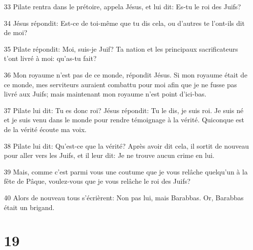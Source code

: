 \par 33 Pilate rentra dans le prétoire, appela Jésus, et lui dit: Es-tu le roi des Juifs?
\par 34 Jésus répondit: Est-ce de toi-même que tu dis cela, ou d'autres te l'ont-ils dit de moi?
\par 35 Pilate répondit: Moi, suis-je Juif? Ta nation et les principaux sacrificateurs t'ont livré à moi: qu'as-tu fait?
\par 36 Mon royaume n'est pas de ce monde, répondit Jésus. Si mon royaume était de ce monde, mes serviteurs auraient combattu pour moi afin que je ne fusse pas livré aux Juifs; mais maintenant mon royaume n'est point d'ici-bas.
\par 37 Pilate lui dit: Tu es donc roi? Jésus répondit: Tu le dis, je suis roi. Je suis né et je suis venu dans le monde pour rendre témoignage à la vérité. Quiconque est de la vérité écoute ma voix.
\par 38 Pilate lui dit: Qu'est-ce que la vérité? Après avoir dit cela, il sortit de nouveau pour aller vers les Juifs, et il leur dit: Je ne trouve aucun crime en lui.
\par 39 Mais, comme c'est parmi vous une coutume que je vous relâche quelqu'un à la fête de Pâque, voulez-vous que je vous relâche le roi des Juifs?
\par 40 Alors de nouveau tous s'écrièrent: Non pas lui, mais Barabbas. Or, Barabbas était un brigand.

\chapter{19}

